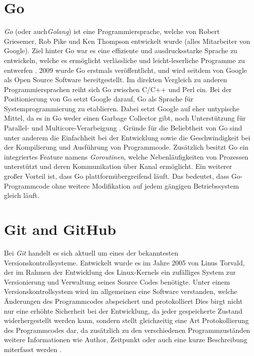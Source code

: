 \section{Go}
\textit{Go} (oder auch\textit{Golang}) ist eine Programmiersprache, welche von
Robert Griesemer, Rob Pike und Ken Thompson entwickelt wurde (alles Mitarbeiter
von Google). Ziel hinter Go war es eine effiziente und ausdrucksstarke Sprache
zu entwickeln, welche es ermöglicht verlässliche und
leicht-leserliche Programme zu entwerfen \autocite{donovan_kernighan_2016}.
2009 wurde Go erstmals veröffentlicht, und wird seitdem von Google als Open Source
Software bereitgestellt. \newline
Im direkten Vergleich zu anderen Programmiersprachen reiht sich Go zwischen
C/C++ und Perl ein. Bei der Positionierung von Go setzt Google darauf, Go als
Sprache für Systemprogrammierung zu etablieren. Dabei setzt Google auf eher
untypische Mittel, da es in Go weder einen Garbage Collector gibt, noch
Unterstützung für Parallel- und Multicore-Verarbeigung
\autocite{feike_blass_2012}. \newline 
Gründe für die Beliebtheit von Go sind unter anderem die Einfachheit bei der
Entwicklung sowie die Geschwindigkeit bei der Kompilierung und
Ausführung von Programmcode. Zusätzlich besitzt Go ein integriertes Feature namens
\textit{Goroutinen}, welche Nebenläufigkeiten von Prozessen unterstützt und
deren Kommunikation über Kanal ermöglicht. 
Ein weiterer großer Vorteil ist, dass Go plattformübergreifend läuft. Das bedeutet,
dass Go-Programmcode ohne weitere Modifikation auf jedem gängigen Betriebssystem gleich
läuft.
\autocite{donovan_kernighan_2016}


\section{Git and GitHub}
Bei \textit{Git} handelt es sich aktuell um eines der bekanntesten
Versionskontrollsysteme. Entwickelt wurde es im Jahre 2005 von Linus Torvald,
der im Rahmen der Entwicklung des Linux-Kernels ein zufälliges System zur
Versionierung und Verwaltung seines Source Codes benötigte. Unter einem
Versionskontrollsystem wird im allgemeinen eine Software verstanden, welche
Änderungen des Programmcodes abspeichert und protokolliert Dies birgt nicht nur
eine erhöhte Sicherheit bei der Entwicklung, da jeder gespeicherte Zustand
widerhergestellt werden kann, sondern stellt gleichzeitig eine Art
Protokollierung des Programmcodes dar, da zusätzlich zu den verschiedenen
Programmzuständen weitere Informationen wie Author, Zeitpunkt oder auch eine
kurze Beschreibung miterfasst werden \autocite{preissel_stachmann_2017}. \hfill
\break 

